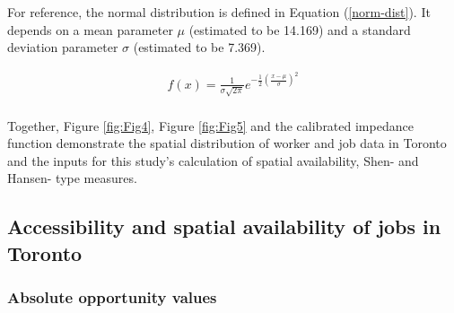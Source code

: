\documentclass[10pt,letterpaper]{article}
\begin{document}
For reference, the normal distribution is defined in Equation
(\ref{norm-dist}). It depends on a mean parameter \(\mu\) (estimated to
be 14.169) and a standard deviation parameter \(\sigma\) (estimated to
be 7.369).

\begin{equation}
\label{norm-dist}
\begin{array}{l} 
f(x) = \frac{1}{\sigma \sqrt{2\pi}}e^{-\frac{1}{2}(\frac{x-\mu}{\sigma})^2}\\
\end{array}
\end{equation}

Together, Figure \ref{fig:Fig4}, Figure \ref{fig:Fig5} and the
calibrated impedance function demonstrate the spatial distribution of
worker and job data in Toronto and the inputs for this study's
calculation of spatial availability, Shen- and Hansen- type measures.

\hypertarget{accessibility-and-spatial-availability-of-jobs-in-toronto}{%
\subsection{Accessibility and spatial availability of jobs in
Toronto}\label{accessibility-and-spatial-availability-of-jobs-in-toronto}}

\hypertarget{absolute-opportunity-values}{%
\subsubsection{Absolute opportunity
values}\label{absolute-opportunity-values}}
\end{document}
